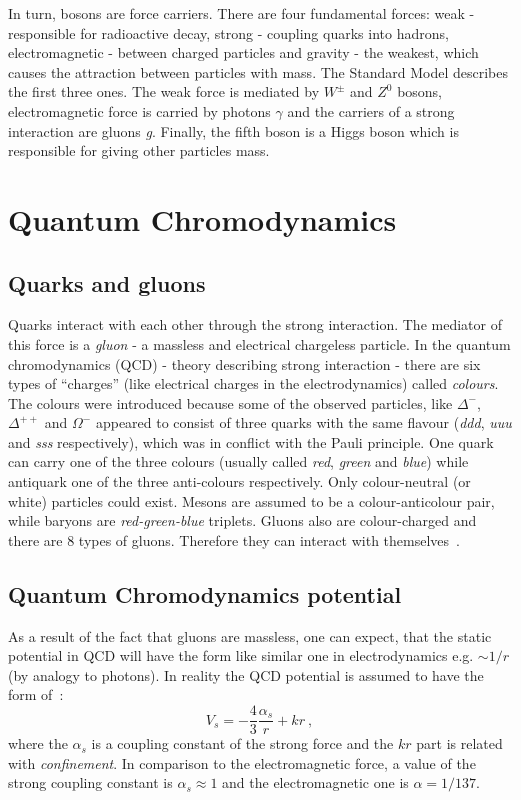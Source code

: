     In turn, bosons are force carriers.
    There are four fundamental forces: weak - responsible for radioactive decay, strong - coupling quarks into hadrons, electromagnetic - between charged particles and gravity - the weakest, which causes the attraction between particles with mass.
    The Standard Model describes the first three ones.
    The weak force is mediated by $W^{\pm}$ and $Z^0$ bosons, electromagnetic force is carried by photons $\gamma$ and the carriers of a strong interaction are gluons \textit{g}.
    Finally, the fifth boson is a Higgs boson which is responsible for giving other particles mass. 
 
  \section{Quantum Chromodynamics}
    \subsection{Quarks and gluons}
      Quarks interact with each other through the strong interaction.
      The mediator of this force is a \textit{gluon} - a massless and electrical chargeless particle.
      In the quantum chromodynamics (QCD) - theory describing strong interaction - there are six types of ``charges'' (like electrical charges in the electrodynamics) called \textit{colours}.
      The colours were introduced because some of the observed particles, like $\Delta^{-}$, $\Delta^{++}$ and $\Omega^{-}$ appeared to consist of three quarks with the same flavour (\textit{ddd}, \textit{uuu} and \textit{sss} respectively), which was in conflict with the Pauli principle.
      One quark can carry one of the three colours (usually called \textit{red}, \textit{green} and \textit{blue}) while antiquark one of the three anti-colours respectively.
      Only colour-neutral (or white) particles could exist.
      Mesons are assumed to be a colour-anticolour pair, while baryons are \textit{red-green-blue} triplets.
      Gluons also are colour-charged and there are 8 types of gluons.
      Therefore they can interact with themselves~\cite{perkins}.
    \subsection{Quantum Chromodynamics potential}
      As a result of the fact that gluons are massless, one can expect, that the static potential in QCD will have the form like similar one in electrodynamics e.g. \mbox{$\sim 1/r$} (by analogy to photons).
      In reality the QCD potential is assumed to have the form of~\cite{perkins}:
      \begin{equation}
        V_s = - \frac{4}{3} \frac{\alpha_s}{r} + kr~,
        \label{eq:qcd_potential}
      \end{equation}
      where the $\alpha_s$ is a coupling constant of the strong force and the $kr$ part is related with \textit{confinement}.
      In comparison to the electromagnetic force, a value of the strong coupling constant is $\alpha_s \approx 1$ and the electromagnetic one is $\alpha = 1/137$.

